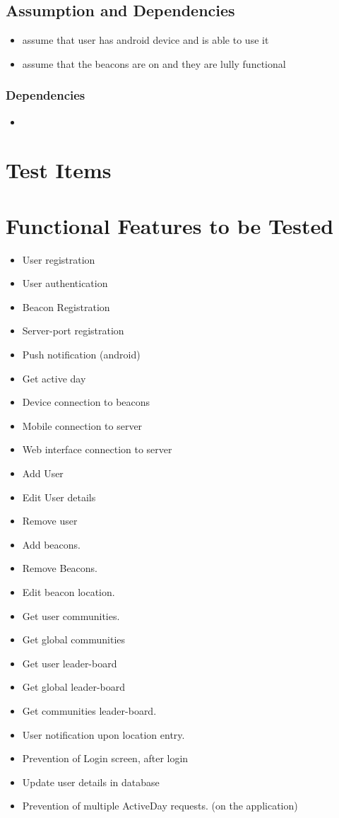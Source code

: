 \documentclass[11pt]{article}
\begin{document}
\subsection{Assumption and Dependencies}
\begin{itemize}
	\item assume that user has android device and is able to use it
	\item assume that the beacons are on and they are lully functional
\end{itemize}

\subsubsection{Dependencies}
\begin{itemize}
	\item	
\end{itemize}

\section{Test Items}
\section{Functional Features to be Tested}
\begin{itemize}
	\item User registration
	\item User authentication
	\item Beacon Registration
	\item Server-port registration
	\item Push notification (android)
	\item Get active day
	\item Device connection to beacons
	\item Mobile connection to server
	\item Web interface connection to server
	\item Add User
	\item Edit User details
	\item Remove user
	\item Add beacons.
	\item Remove Beacons.
	\item Edit beacon location.
	\item Get user communities.
	\item Get global communities
	\item Get user leader-board
	\item Get global leader-board
	\item Get communities leader-board.
	\item User notification upon location entry.
	\item Prevention of Login screen, after login 
	\item Update user details in database 
	\item Prevention of multiple ActiveDay requests. (on the application)
\end{itemize}
\end{document}
